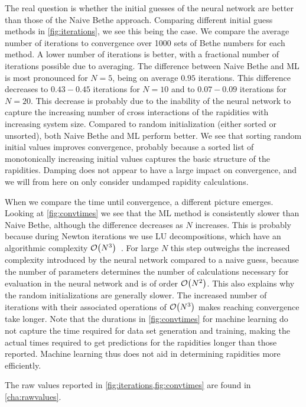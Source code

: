 \documentclass[11pt, a4paper]{report} %
\begin{document}
The real question is whether the initial guesses of the neural network are better than those of the Naive Bethe approach.
Comparing different initial guess methods in \cref{fig:iterations}, we see this being the case.
We compare the average number of iterations to convergence over 1000 sets of Bethe numbers for each method.
A lower number of iterations is better, with a fractional number of iterations possible due to averaging.
The difference between Naive Bethe and ML is most pronounced for \(N=5\), being on average \(0.95\) iterations.
This difference decreases to \(0.43-0.45\) iterations for \(N=10\) and to \(0.07-0.09\) iterations for \(N=20\).
This decrease is probably due to the inability of the neural network to capture the increasing number of cross interactions of the rapidities with increasing system size.
Compared to random initialization (either sorted or unsorted), both Naive Bethe and ML perform better.
We see that sorting random initial values improves convergence, probably because a sorted list of monotonically increasing initial values captures the basic structure of the rapidities.
Damping does not appear to have a large impact on convergence, and we will from here on only consider undamped rapidity calculations.

When we compare the time until convergence, a different picture emerges.
Looking at \cref{fig:convtimes} we see that the ML method is consistently slower than Naive Bethe, although the difference decreases as \(N\) increases.
This is probably because during Newton iterations we use LU decompositions, which have an algorithmic complexity \(\order{N^3}\)~\cite{Press2007}.
For large \(N\) this step outweighs the increased complexity introduced by the neural network compared to a naive guess, because the number of parameters determines the number of calculations necessary for evaluation in the neural network and is of order \(\order{N^2}\).
This also explains why the random initializations are generally slower. 
The increased number of iterations with their associated operations of \(\order{N^3}\) makes reaching convergence take longer.
Note that the durations in \cref{fig:convtimes} for machine learning do not capture the time required for data set generation and training, making the actual times required to get predictions for the rapidities longer than those reported.
Machine learning thus does not aid in determining rapidities more efficiently.

The raw values reported in \cref{fig:iterations,fig:convtimes} are found in \cref{cha:rawvalues}.
\end{document}
